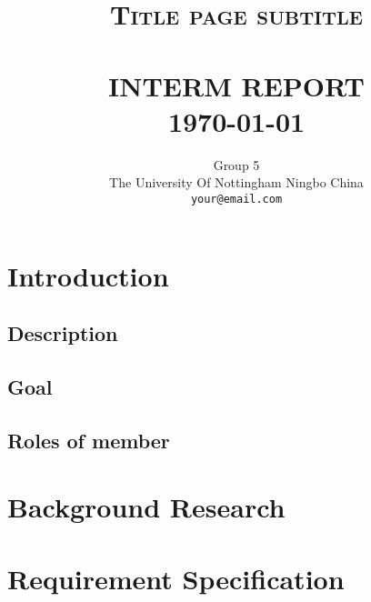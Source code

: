\documentclass[paper=a4, fontsize=11pt,twoside]{scrartcl}		%
\title{	\normalsize \textsc{Title page subtitle} 	%
		 	\\[2.0cm]													%
			\HRule{0.5pt} \\										%
			\LARGE \textbf{\uppercase{Interm Report}}	%
			\HRule{2pt} \\ [0.5cm]								%
			\normalsize \today									%
		}
\author{
		Group 5\\	
		The University Of Nottingham Ningbo China\\	
        \texttt{your@email.com} \\
}
\makeatletter
\def\printtitle{%
    {\centering \@title\par}}
\def\printauthor{%
    {\centering \large \@author}}
\makeatother
\begin{document}
\thispagestyle{empty}				%

\printtitle									%
  	\vfill
\printauthor								%
\newpage
\tableofcontents

\newpage



\section{Introduction}
\subsection{Description}
\subsection{Goal}
\subsection{Roles of member }

\section{Background Research}


\section{Requirement Specification}
\end{document}
